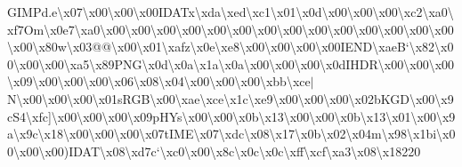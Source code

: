 \begin{DoxyCompactItemize}
G\+I\+M\+Pd.\+e\textbackslash{}x07\textbackslash{}x00\textbackslash{}x00\textbackslash{}x00\textquotesingle{}\+I\+D\+A\+Tx\textbackslash{}xda\textbackslash{}xed\textbackslash{}xc1\textbackslash{}x01\textbackslash{}x0d\textbackslash{}x00\textbackslash{}x00\textbackslash{}x00\textbackslash{}xc2\textbackslash{}xa0\textbackslash{}xf7\+Om\textbackslash{}x0e7\textbackslash{}xa0\textbackslash{}x00\textbackslash{}x00\textbackslash{}x00\textbackslash{}x00\textbackslash{}x00\textbackslash{}x00\textbackslash{}x00\textbackslash{}x00\textbackslash{}x00\textbackslash{}x00\textbackslash{}x00\textbackslash{}x00\textbackslash{}x00\textbackslash{}x00\textbackslash{}x00\textbackslash{}x80w\textbackslash{}x03@@\textbackslash{}x00\textbackslash{}x01\textbackslash{}xafz\textbackslash{}x0e\textbackslash{}xe8\textbackslash{}x00\textbackslash{}x00\textbackslash{}x00\textbackslash{}x00\+I\+E\+N\+D\textbackslash{}xae\+B`\textbackslash{}x82\textbackslash{}x00\textbackslash{}x00\textbackslash{}x00\textbackslash{}xa5\textbackslash{}x89\+P\+N\+G\textbackslash{}x0d\textbackslash{}x0a\textbackslash{}x1a\textbackslash{}x0a\textbackslash{}x00\textbackslash{}x00\textbackslash{}x00\textbackslash{}x0d\+I\+H\+D\+R\textbackslash{}x00\textbackslash{}x00\textbackslash{}x00\textbackslash{}x09\textbackslash{}x00\textbackslash{}x00\textbackslash{}x00\textbackslash{}x06\textbackslash{}x08\textbackslash{}x04\textbackslash{}x00\textbackslash{}x00\textbackslash{}x00\textbackslash{}xbb\textbackslash{}xce$\vert$\+N\textbackslash{}x00\textbackslash{}x00\textbackslash{}x00\textbackslash{}x01s\+R\+G\+B\textbackslash{}x00\textbackslash{}xae\textbackslash{}xce\textbackslash{}x1c\textbackslash{}xe9\textbackslash{}x00\textbackslash{}x00\textbackslash{}x00\textbackslash{}x02b\+K\+G\+D\textbackslash{}x00\textbackslash{}x9c\+S4\textbackslash{}xfc\mbox{]}\textbackslash{}x00\textbackslash{}x00\textbackslash{}x00\textbackslash{}x09p\+H\+Ys\textbackslash{}x00\textbackslash{}x00\textbackslash{}x0b\textbackslash{}x13\textbackslash{}x00\textbackslash{}x00\textbackslash{}x0b\textbackslash{}x13\textbackslash{}x01\textbackslash{}x00\textbackslash{}x9a\textbackslash{}x9c\textbackslash{}x18\textbackslash{}x00\textbackslash{}x00\textbackslash{}x00\textbackslash{}x07t\+I\+M\+E\textbackslash{}x07\textbackslash{}xdc\textbackslash{}x08\textbackslash{}x17\textbackslash{}x0b\textbackslash{}x02\textbackslash{}x04m\textbackslash{}x98\textbackslash{}x1bi\textbackslash{}x00\textbackslash{}x00\textbackslash{}x00)\+I\+D\+A\+T\textbackslash{}x08\textbackslash{}xd7c`\textbackslash{}xc0\textbackslash{}x00\textbackslash{}x8c\textbackslash{}x0c\textbackslash{}x0c\textbackslash{}xff\textbackslash{}xcf\textbackslash{}xa3\textbackslash{}x08\textbackslash{}x18220 
\end{DoxyCompactItemize}
